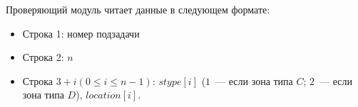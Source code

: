Проверяющий модуль читает данные в следующем формате:

\begin{itemize}
\item Строка 1: номер подзадачи
\item Строка 2: $n$
\item Строка $3 + i (0 \le i \le n - 1)$: $stype[i]$ ($1$~--- если зона типа $C$; $2$~--- если зона типа $D$), $location[i]$.
\end{itemize}